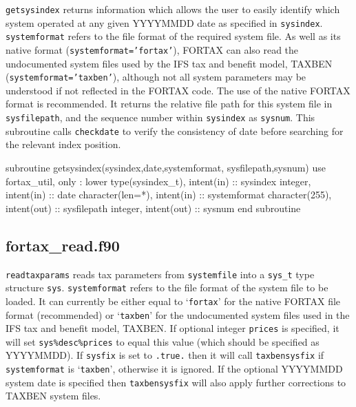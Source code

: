 \documentclass[11pt,thmsa,letter,ukenglish]{article}
\begin{document}
\noindent\texttt{getsysindex} returns information which allows the user to easily identify which system operated at any given YYYYMMDD date as specified in \texttt{sysindex}. \texttt{systemformat} refers to the file format of the required system file. As well as its native format (\texttt{systemformat='fortax'}), FORTAX can also read the undocumented system files used by the IFS tax and benefit model, TAXBEN (\texttt{systemformat='taxben'}), although not all system parameters may be understood if not reflected in the FORTAX code. The use of the native FORTAX format is recommended. It returns the relative file path for this system file in \texttt{sysfilepath}, and the sequence number within \texttt{sysindex} as \texttt{sysnum}. This subroutine calls \texttt{checkdate} to verify the consistency of date before searching for the relevant index position.

\begin{fortrancode}
subroutine getsysindex(sysindex,date,systemformat, sysfilepath,sysnum)
    use fortax_util, only : lower
    type(sysindex_t), intent(in)  :: sysindex
    integer,          intent(in)  :: date
    character(len=*), intent(in)  :: systemformat
    character(255),   intent(out) :: sysfilepath
    integer,          intent(out) :: sysnum
end subroutine
\end{fortrancode}

\subsection{fortax\_read.f90}\label{sec:fortaxread}

\texttt{readtaxparams} reads tax parameters from \texttt{systemfile} into a \texttt{sys\_t} type structure \texttt{sys}. \texttt{systemformat} refers to the file format of the system file to be loaded. It can currently be either equal to `\texttt{fortax}' for the native FORTAX file format (recommended) or `\texttt{taxben}' for the undocumented system files used in the IFS tax and benefit model, TAXBEN. If optional integer \texttt{prices} is specified, it will set \texttt{sys\%desc\%prices} to equal this value (which should be specified as YYYYMMDD). If \texttt{sysfix} is set to \texttt{.true.} then it will call \texttt{taxbensysfix} if \texttt{systemformat} is `\texttt{taxben}', otherwise it is ignored. If the optional YYYYMMDD system date is specified then \texttt{taxbensysfix} will also apply further corrections to TAXBEN system files.
\end{document}
